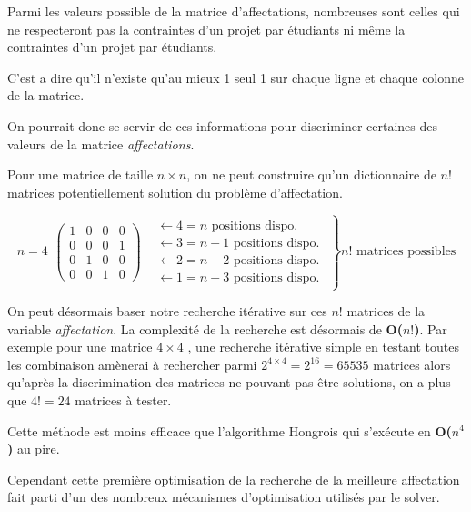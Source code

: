 \documentclass[final,poster]{polytech/polytech}
\begin{document}
Parmi les valeurs possible de la matrice d'affectations, nombreuses sont celles qui ne respecteront pas la contraintes d'un projet par étudiants ni même la contraintes d'un projet par étudiants. 

C'est a dire qu'il n'existe qu'au mieux 1 seul 1 sur chaque ligne et chaque colonne de la matrice.

On pourrait donc se servir de ces informations pour discriminer certaines des valeurs de la matrice \textit{affectations}.

Pour une matrice de taille $n\times n$, on ne peut construire qu'un dictionnaire de $n!$ matrices potentiellement solution du problème d'affectation. 

\begin{equation}
\left.
n=4
\begin{array}{cc}
\left(
\begin{array}{cccc}
1 & 0 & 0 & 0 \\ 
0 & 0 & 0 & 1 \\ 
0 & 1 & 0 & 0 \\ 
0 & 0 & 1 & 0
\end{array} 
\right)
&
\begin{array}{l}
\leftarrow 4=n \text{  positions dispo.}\\ 
\leftarrow 3=n-1 \text{  positions dispo.} \\ 
\leftarrow 2=n-2 \text{  positions dispo.}\\ 
\leftarrow 1=n-3 \text{  positions dispo.}
\end{array} 
\end{array}
\right\rbrace
n! \text{ matrices possibles}
\end{equation}

On peut désormais baser notre recherche itérative sur ces $n!$ matrices de la variable \textit{affectation}. La complexité de la recherche est désormais de  \textbf{O($n!$)}. Par exemple pour une matrice $4\times 4$ , une recherche itérative simple en testant toutes les combinaison amènerai à rechercher parmi $2^{4\times 4} = 2^{16}=65535$ matrices alors qu'après la discrimination des matrices ne pouvant pas être solutions, on a plus que $4!=24$ matrices à tester. 

Cette méthode est moins efficace que l'algorithme Hongrois qui s'exécute en \textbf{O($n^4$)} au pire.

Cependant cette première optimisation de la recherche de la meilleure affectation fait parti d'un des nombreux mécanismes d'optimisation utilisés par le solver.
\end{document}
